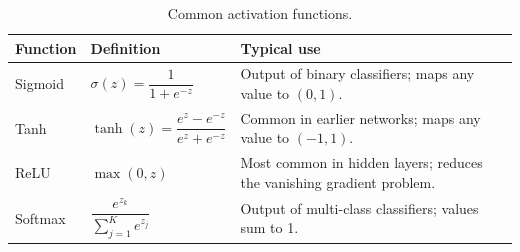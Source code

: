 \begin{table}[t]
  \centering
  \caption{Common activation functions.}
  \label{tab:activation_functions}
  \small
  \begin{tabular}{@{}p{}p{}p{}@{}}
    \toprule
    Function & Definition & Typical use \\
    \midrule
    Sigmoid & $\sigma(z) = \dfrac{1}{1 + e^{-z}}$ & Output of binary classifiers; maps any value to $(0, 1)$. \\
    Tanh    & $\tanh(z) = \dfrac{e^{z} - e^{-z}}{e^{z} + e^{-z}}$ & Common in earlier networks; maps any value to $(-1, 1)$. \\
    ReLU    & $\max(0, z)$ & Most common in hidden layers; reduces the vanishing gradient problem. \\
    Softmax & $\dfrac{e^{z_k}}{\sum_{j=1}^{K} e^{z_j}}$ & Output of multi-class classifiers; values sum to 1. \\
    \bottomrule
  \end{tabular}
\end{table}
